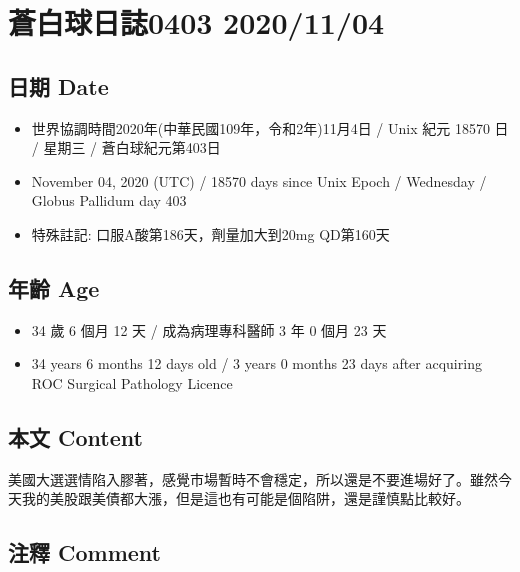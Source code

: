 \documentclass[
]{article}
\providecommand{\tightlist}{%
  \setlength{\itemsep}{0pt}\setlength{\parskip}{0pt}}
\begin{document}
\hypertarget{ux84bcux767dux7403ux65e5ux8a8c0403-20201104}{%
\section{蒼白球日誌0403
2020/11/04}\label{ux84bcux767dux7403ux65e5ux8a8c0403-20201104}}

\hypertarget{ux65e5ux671f-date-61}{%
\subsection{日期 Date}\label{ux65e5ux671f-date-61}}

\begin{itemize}
\tightlist
\item
  世界協調時間2020年(中華民國109年，令和2年)11月4日 / Unix 紀元 18570 日
  / 星期三 / 蒼白球紀元第403日
\item
  November 04, 2020 (UTC) / 18570 days since Unix Epoch / Wednesday /
  Globus Pallidum day 403
\item
  特殊註記: 口服A酸第186天，劑量加大到20mg QD第160天
\end{itemize}

\hypertarget{ux5e74ux9f61-age-61}{%
\subsection{年齡 Age}\label{ux5e74ux9f61-age-61}}

\begin{itemize}
\tightlist
\item
  34 歲 6 個月 12 天 / 成為病理專科醫師 3 年 0 個月 23 天
\item
  34 years 6 months 12 days old / 3 years 0 months 23 days after
  acquiring ROC Surgical Pathology Licence
\end{itemize}

\hypertarget{ux672cux6587-content-61}{%
\subsection{本文 Content}\label{ux672cux6587-content-61}}

美國大選選情陷入膠著，感覺市場暫時不會穩定，所以還是不要進場好了。雖然今天我的美股跟美債都大漲，但是這也有可能是個陷阱，還是謹慎點比較好。

\hypertarget{ux6ce8ux91cb-comment-61}{%
\subsection{注釋 Comment}\label{ux6ce8ux91cb-comment-61}}
\end{document}

